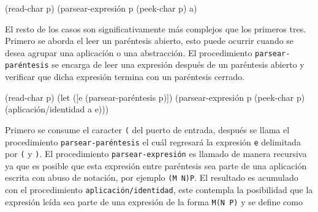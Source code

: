 \documentclass[letterpaper,twoside,openright,10pt]{book}
\begin{document}
\nwenddocs{}\endmoddef
(read-char p)
(parsear-expresión p (peek-char p) a)
\nwendcode{}\nwdocspar

El resto de los casos son significativamente más complejos que los primeros tres. Primero se aborda el leer un paréntesis abierto, esto puede ocurrir cuando se desea agrupar una aplicación o una abstracción. El procedimiento {\tt{}\protect{}parsear-paréntesis} se encarga de leer una expresión después de un paréntesis abierto y verificar que dicha expresión termina con un paréntesis cerrado.

\nwenddocs{}\endmoddef
(read-char p)
(let ([e (parsear-paréntesis p)])
  (parsear-expresión p (peek-char p) (aplicación/identidad a e)))
\nwendcode{}\nwdocspar

Primero se consume el caracter {\tt{}{}{}(} del puerto de entrada, después se llama el procedimiento {\tt{}\protect{}parsear-paréntesis} el cuál regresará la expresión {\tt{}e} delimitada por {\tt{}{}{}(} y {\tt{}{}{})}. El procedimiento {\tt{}\protect{}parsear-expresión} es llamado de manera recursiva ya que es posible que esta expresión entre paréntesis sea parte de una aplicación escrita con abuso de notación, por ejemplo {\tt{}(M\ N)P}. El resultado es acumulado con el procedimiento {\tt{}\protect{}aplicación\protect{}/identidad}, este contempla la posibilidad que la expresión leída sea parte de una expresión de la forma {\tt{}M(N\ P)} y se define como
\end{document}
